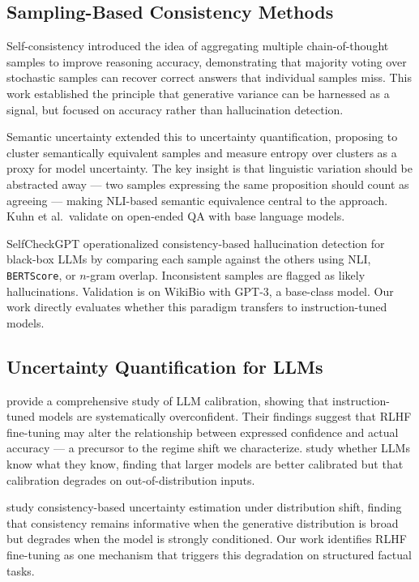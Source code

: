 \subsection{Sampling-Based Consistency Methods}

Self-consistency \cite{Wang2022SelfConsistency} introduced the idea of aggregating multiple chain-of-thought samples to improve reasoning accuracy, demonstrating that majority voting over stochastic samples can recover correct answers that individual samples miss. This work established the principle that generative variance can be harnessed as a signal, but focused on accuracy rather than hallucination detection.

Semantic uncertainty \cite{Kuhn2023Semantic} extended this to uncertainty quantification, proposing to cluster semantically equivalent samples and measure entropy over clusters as a proxy for model uncertainty. The key insight is that linguistic variation should be abstracted away --- two samples expressing the same proposition should count as agreeing --- making NLI-based semantic equivalence central to the approach. Kuhn et al.\ validate on open-ended QA with base language models.

SelfCheckGPT \cite{Manakul2023SelfCheckGPT} operationalized consistency-based hallucination detection for black-box LLMs by comparing each sample against the others using NLI, \texttt{BERTScore}, or $n$-gram overlap. Inconsistent samples are flagged as likely hallucinations. Validation is on WikiBio with GPT-3, a base-class model. Our work directly evaluates whether this paradigm transfers to instruction-tuned models.

\subsection{Uncertainty Quantification for LLMs}

\cite{Xiong2023Can} provide a comprehensive study of LLM calibration, showing that instruction-tuned models are systematically overconfident. Their findings suggest that RLHF fine-tuning may alter the relationship between expressed confidence and actual accuracy --- a precursor to the regime shift we characterize. \cite{Kadavath2022Language} study whether LLMs know what they know, finding that larger models are better calibrated but that calibration degrades on out-of-distribution inputs.

\cite{Lin2024Generating} study consistency-based uncertainty estimation under distribution shift, finding that consistency remains informative when the generative distribution is broad but degrades when the model is strongly conditioned. Our work identifies RLHF fine-tuning as one mechanism that triggers this degradation on structured factual tasks.

